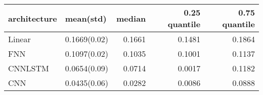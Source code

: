 \begin{tabular}{llrrr}
\toprule
architecture &    mean(std) &  median &  0.25 quantile &  0.75 quantile \\
\midrule
      Linear & 0.1669(0.02) &  0.1661 &         0.1481 &         0.1864 \\
         FNN & 0.1097(0.02) &  0.1035 &         0.1001 &         0.1137 \\
     CNNLSTM & 0.0654(0.09) &  0.0714 &         0.0017 &         0.1182 \\
         CNN & 0.0435(0.06) &  0.0282 &         0.0086 &         0.0888 \\
\bottomrule
\end{tabular}
